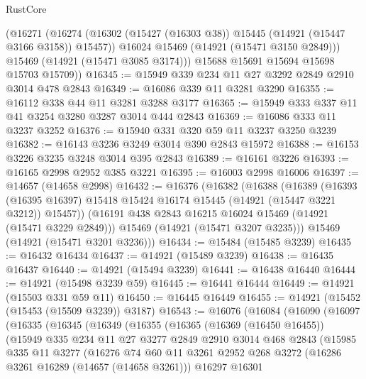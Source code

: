 \begin{lexlean}{RustCore}
\begin{coremodule}
          (@16271
            (@16274 (@16302 (@15427 (@16303 @38)) @15445 (@14921 (@15447 @3166 @3158)) @15457))
            @16024
            @15469
            (@14921 (@15471 @3150 @2849)))
          @15469
          (@14921 (@15471 @3085 @3174)))
        @15688
        @15691
        @15694
        @15698
        @15703
        @15709))
@16345 := @15949 @339 @234 @11 @27 @3292 @2849 @2910 @3014 @478 @2843
@16349 := @16086 @339 @11 @3281 @3290
@16355 := @16112 @338 @44 @11 @3281 @3288 @3177
@16365 := @15949 @333 @337 @11 @41 @3254 @3280 @3287 @3014 @444 @2843
@16369 := @16086 @333 @11 @3237 @3252
@16376 := @15940 @331 @320 @59 @11 @3237 @3250 @3239
@16382 := @16143 @3236 @3249 @3014 @390 @2843 @15972
@16388 := @16153 @3226 @3235 @3248 @3014 @395 @2843
@16389 := @16161 @3226
@16393 := @16165 @2998 @2952 @385 @3221
@16395 := @16003 @2998 @16006
@16397 := @14657 (@14658 @2998)
@16432 := @16376
    (@16382
      (@16388
        (@16389
          (@16393 (@16395 @16397) @15418 @15424 @16174 @15445 (@14921 (@15447 @3221 @3212)) @15457))
        (@16191 @438 @2843 @16215 @16024 @15469 (@14921 (@15471 @3229 @2849)))
        @15469
        (@14921 (@15471 @3207 @3235)))
      @15469
      (@14921 (@15471 @3201 @3236)))
@16434 := @15484 (@15485 @3239)
@16435 := @16432 @16434
@16437 := @14921 (@15489 @3239)
@16438 := @16435 @16437
@16440 := @14921 (@15494 @3239)
@16441 := @16438 @16440
@16444 := @14921 (@15498 @3239 @59)
@16445 := @16441 @16444
@16449 := @14921 (@15503 @331 @59 @11)
@16450 := @16445 @16449
@16455 := @14921 (@15452 (@15453 (@15509 @3239)) @3187)
@16543 := @16076
    (@16084
      (@16090
        (@16097
          (@16335
            (@16345
              (@16349
                (@16355
                  (@16365
                    (@16369 (@16450 @16455))
                    (@15949
                      @335
                      @234
                      @11
                      @27
                      @3277
                      @2849
                      @2910
                      @3014
                      @468
                      @2843
                      (@15985
                        @335
                        @11
                        @3277
                        (@16276
                          @74
                          @60
                          @11
                          @3261
                          @2952
                          @268
                          @3272
                          (@16286 @3261 @16289 (@14657 (@14658 @3261)))
                          @16297
                          @16301

\end{coremodule}
\end{lexlean}
